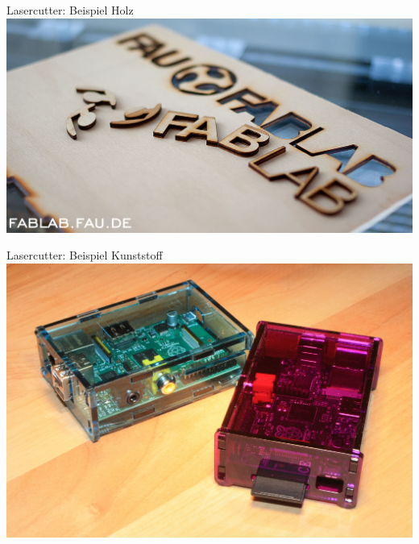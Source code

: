 \documentclass[t]{beamer}
\begin{document}
\begin{frame}{Lasercutter: Beispiel Holz}
	\includegraphics[width=\textwidth]{../img/lasercut-holz.jpg}
\end{frame}
\begin{frame}{Lasercutter: Beispiel Kunststoff}
	\includegraphics[width=\textwidth,clip,trim=0 5cm 0 2cm]{../img/lasercut-kunststoff.jpg}
\end{frame}
\end{document}
